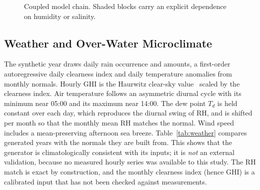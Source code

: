 \documentclass[journal]{IEEEtran}
\begin{document}
\begin{figure}[!t]
\centering
{}
\caption{Coupled model chain. Shaded blocks carry an explicit dependence on humidity or salinity.}
\label{fig:chain}
\end{figure}

\subsection{Weather and Over-Water Microclimate}\label{sec:weather}
The synthetic year draws daily rain occurrence and amounts, a first-order autoregressive daily clearness index and
daily temperature anomalies from monthly normals. Hourly GHI is the Haurwitz clear-sky value~\cite{haurwitz1945}
scaled by the clearness index. Air temperature follows an asymmetric diurnal cycle with its minimum near 05:00 and its
maximum near 14:00. The dew point $T_d$ is held constant over each day, which reproduces the diurnal swing of RH, and
is shifted per month so that the monthly mean RH matches the normal. Wind speed includes a mean-preserving afternoon
sea breeze. Table~\ref{tab:weather} compares \NSeeds{} generated years with the normals they are built from. This shows
that the generator is climatologically consistent with its inputs; it is \emph{not} an external validation, because no
measured hourly series was available to this study. The RH match is exact by construction, and the monthly
clearness index (hence GHI) is a calibrated input that has not been checked against measurements.
\end{document}
